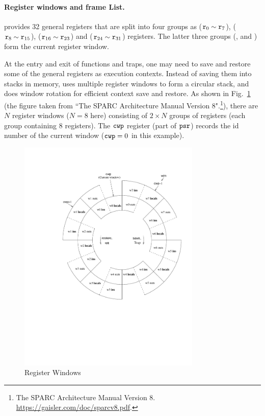 \paragraph{\textbf{Register windows and frame List.}}
\sparc{} provides 32 general registers that are split into
four groups
as \globalRN{} ($\texttt{r}_{0} \sim \texttt{r}_{7}$),
\outRN{} ($\texttt{r}_{8} \sim \texttt{r}_{15}$), \localRN ($\texttt{r}_{16} \sim \texttt{r}_{23}$)
and \inRN{} ($\texttt{r}_{24} \sim \texttt{r}_{31}$) registers.
The latter three groups (\outRN{}, \localRN{} and \inRN{})
form the current register window.

At the entry and exit of functions and traps, one may need to
save and restore some of the general registers as execution
contexts. Instead of saving them into stacks in memory,
\sparc{} uses multiple register windows to form a circular
stack, and does window rotation for efficient context save and restore.
As shown in Fig.~\ref{fig:RegisterWindows}
(the figure taken from ``The SPARC Architecture Manual Version 8".\footnote{The SPARC Architecture Manual Version 8. 
\url{https://gaisler.com/doc/sparcv8.pdf}.}), 
there are $N$
register windows ($N=8$ here) consisting of $2\times N$
groups of registers (each group containing 8 registers).
The $\texttt{cwp}$ register (part of $\texttt{psr}$) records the id number
of the current window ($\texttt{cwp}=0$ in this example).
\begin{figure}[!t]
	\centering
	\includegraphics[width=8.7cm]{window}
	\caption{Register Windows}
	\label{fig:RegisterWindows}
\end{figure}


